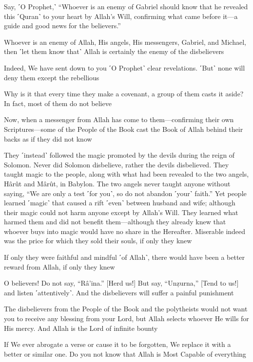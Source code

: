 Say, ˹O Prophet,˺ “Whoever is an enemy of Gabriel should know that he revealed this ˹Quran˺ to your heart by Allah’s Will, confirming what came before it—a guide and good news for the believers.”

Whoever is an enemy of Allah, His angels, His messengers, Gabriel, and Michael, then ˹let them know that˺ Allah is certainly the enemy of the disbelievers

Indeed, We have sent down to you ˹O Prophet˺ clear revelations. ˹But˺ none will deny them except the rebellious

Why is it that every time they make a covenant, a group of them casts it aside? In fact, most of them do not believe

Now, when a messenger from Allah has come to them—confirming their own Scriptures—some of the People of the Book cast the Book of Allah behind their backs as if they did not know

They ˹instead˺ followed the magic promoted by the devils during the reign of Solomon. Never did Solomon disbelieve, rather the devils disbelieved. They taught magic to the people, along with what had been revealed to the two angels, Hârût and Mârût, in Babylon. The two angels never taught anyone without saying, “We are only a test ˹for you˺, so do not abandon ˹your˺ faith.” Yet people learned ˹magic˺ that caused a rift ˹even˺ between husband and wife; although their magic could not harm anyone except by Allah’s Will. They learned what harmed them and did not benefit them—although they already knew that whoever buys into magic would have no share in the Hereafter. Miserable indeed was the price for which they sold their souls, if only they knew

If only they were faithful and mindful ˹of Allah˺, there would have been a better reward from Allah, if only they knew

O believers! Do not say, “Râ’ina.” [Herd us!] But say, “Unẓurna,” [Tend to us!] and listen ˹attentively˺. And the disbelievers will suffer a painful punishment

The disbelievers from the People of the Book and the polytheists would not want you to receive any blessing from your Lord, but Allah selects whoever He wills for His mercy. And Allah is the Lord of infinite bounty

If We ever abrogate a verse or cause it to be forgotten, We replace it with a better or similar one. Do you not know that Allah is Most Capable of everything

